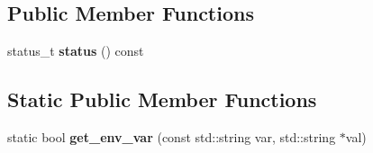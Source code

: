 \subsection*{Public Member Functions}
\begin{CompactItemize}
\item 
status\_\-t \textbf{status} () const \label{classASCbase_1_1BaseParameters_39657de7d43af517724736e1c625546f}

\end{CompactItemize}
\subsection*{Static Public Member Functions}
\begin{CompactItemize}
\item 
static bool \textbf{get\_\-env\_\-var} (const std::string var, std::string $\ast$val)\label{classASCbase_1_1BaseParameters_f0c9884a0104f3b2e8595d401db60653}

\end{CompactItemize}

